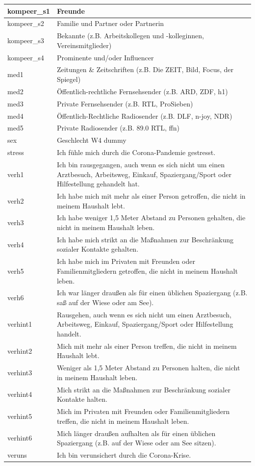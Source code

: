 \documentclass[
]{book}
\begin{document}
\begin{tabular}{l|l}
\hline
kompeer\_s1 & Freunde\\
\hline
kompeer\_s2 & Familie und Partner oder Partnerin\\
\hline
kompeer\_s3 & Bekannte (z.B. Arbeitskollegen und -kolleginnen, Vereinsmitglieder)\\
\hline
kompeer\_s4 & Prominente und/oder Influencer\\
\hline
med1 & Zeitungen \& Zeitschriften (z.B. Die ZEIT, Bild, Focus, der Spiegel)\\
\hline
med2 & Öffentlich-rechtliche Fernsehsender (z.B. ARD, ZDF, h1)\\
\hline
med3 & Private Fernsehsender (z.B. RTL, ProSieben)\\
\hline
med4 & Öffentlich-Rechtliche Radiosender (z.B. DLF, n-joy, NDR)\\
\hline
med5 & Private Radiosender (z.B. 89.0 RTL, ffn)\\
\hline
sex & Geschlecht W4 dummy\\
\hline
stress & Ich fühle mich durch die Corona-Pandemie gestresst.\\
\hline
verh1 & Ich bin rausgegangen, auch wenn es sich nicht um einen Arztbesuch, Arbeitsweg, Einkauf, Spaziergang/Sport oder Hilfestellung gehandelt hat.\\
\hline
verh2 & Ich habe mich mit mehr als einer Person getroffen, die nicht in meinem Haushalt lebt.\\
\hline
verh3 & Ich habe weniger 1,5 Meter Abstand zu Personen gehalten, die nicht in meinem Haushalt leben.\\
\hline
verh4 & Ich habe mich strikt an die Maßnahmen zur Beschränkung sozialer Kontakte gehalten.\\
\hline
verh5 & Ich habe mich im Privaten mit Freunden oder Familienmitgliedern getroffen, die nicht in meinem Haushalt leben.\\
\hline
verh6 & Ich war länger draußen als für einen üblichen Spaziergang (z.B. saß auf der Wiese oder am See).\\
\hline
verhint1 & Rausgehen, auch wenn es sich nicht um einen Arztbesuch, Arbeitsweg, Einkauf, Spaziergang/Sport oder Hilfestellung handelt.\\
\hline
verhint2 & Mich mit mehr als einer Person treffen, die nicht in meinem Haushalt lebt.\\
\hline
verhint3 & Weniger als 1,5 Meter Abstand zu Personen halten, die nicht in meinem Haushalt leben.\\
\hline
verhint4 & Mich strikt an die Maßnahmen zur Beschränkung sozialer Kontakte halten.\\
\hline
verhint5 & Mich im Privaten mit Freunden oder Familienmitgliedern treffen, die nicht in meinem Haushalt leben.\\
\hline
verhint6 & Mich länger draußen aufhalten als für einen üblichen Spaziergang (z.B. auf der Wiese oder am See sitzen).\\
\hline
veruns & Ich bin verunsichert durch die Corona-Krise.\\
\hline
\end{tabular}
\end{document}
